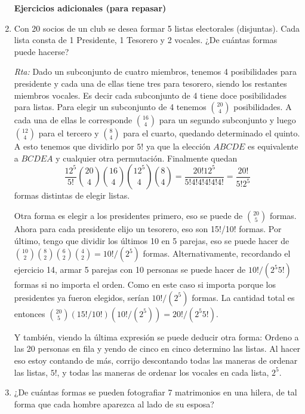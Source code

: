 \documentclass[a4paper,12pt,twoside,spanish,reqno]{amsbook}
\numberwithin{equation}{section}
\begin{document}
\begin{enumerate}
\medskip


\begin{center}
    \textbf{Ejercicios adicionales (para repasar)}
\end{center}


\medskip

\item Con 20 socios de un club se desea formar 5 listas electorales (disjuntas). Cada lista
consta de 1 Presidente, 1 Tesorero y 2 vocales. ¿De cuántas formas puede hacerse?

\noindent\textit{Rta:} Dado un subconjunto de cuatro miembros, tenemos 4 posibilidades para presidente y cada una de ellas tiene tres para tesorero, siendo los restantes miembros vocales. Es decir cada subconjunto de 4 tiene doce posibilidades para listas. Para elegir un subconjunto de 4 tenemos $\binom{20}{4}$ posibilidades. A cada una de ellas le corresponde $\binom{16}{4}$ para un segundo subconjunto y luego $\binom{12}{4}$ para el tercero y $\binom{8}{4}$ para el cuarto, quedando determinado el quinto. A esto tenemos que dividirlo por $5!$ ya que la elección $ABCDE$ es equivalente a  $BCDEA$ y cualquier otra permutación. 
Finalmente quedan $$\frac{12^5}{5!}\binom{20}{4}\binom{16}{4}\binom{12^5}{4}\binom{8}{4}=\frac{20!12^5}{5!4!4!4!4!4!}=\frac{20!}{5!2^5}$$ formas distintas de elegir listas.

Otra forma es elegir a los presidentes primero, eso se puede de $\binom{20}{5}$ formas. Ahora para cada presidente elijo un tesorero, eso son 15!/10! formas. Por último, tengo que dividir los últimos 10 en 5 parejas, eso se puede hacer de ${10 \choose 2} {8 \choose 2} {6 \choose 2} {4 \choose 2} = 10! / ( 2^5)$ formas. Alternativamente, recordando el ejercicio 14, armar 5 parejas con 10 personas se puede hacer de $10! / ( 2^5 5!)$ formas si no importa el orden. Como en este caso si importa porque los presidentes ya fueron elegidos, serían $10! / ( 2^5)$ formas. La cantidad total es entonces $\binom{20}{5} (15! / 10!) ( 10! / ( 2^5) ) = 20! / (2^5 5!)$.

Y también, viendo la última expresión se puede deducir otra forma: Ordeno a las 20 personas en fila y yendo de cinco en cinco determino las listas. Al hacer eso estoy contando de más, corrijo descontando todas las maneras de ordenar las listas, $5!$, y todas las maneras de ordenar los vocales en cada lista, $2^5$.

\medskip

\item ¿De cuántas formas se pueden fotografiar 7 matrimonios en una hilera, de tal forma
que cada hombre aparezca al lado de su esposa?


\end{enumerate}
\end{document}
